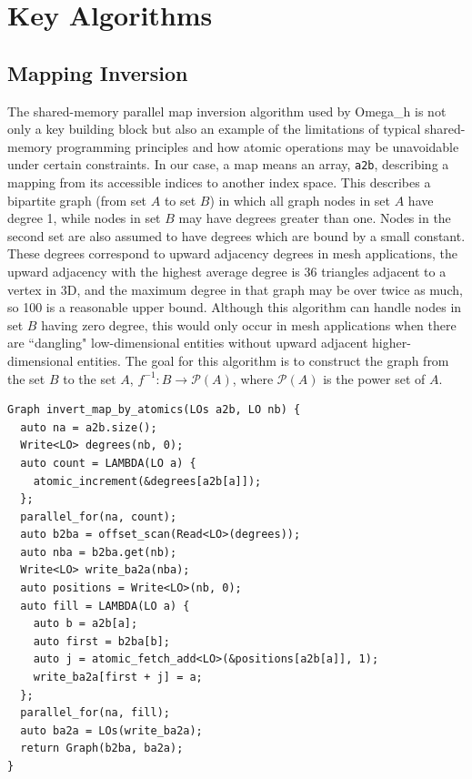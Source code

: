 
\appendix    %

\chapter{Key Algorithms}

\section{Mapping Inversion}
\label{sec:invert_map}

The shared-memory parallel map inversion algorithm used by
Omega\_h is not only a key building block but also an example
of the limitations of typical shared-memory programming principles
and how atomic operations may be unavoidable under certain constraints.
In our case, a map means an array, \texttt{a2b}, describing a mapping from
its accessible indices to another index space.
This describes a bipartite graph (from set $A$ to set $B$) in which all graph nodes
in set $A$ have degree 1, while nodes in set $B$ may
have degrees greater than one.
Nodes in the second set are also assumed to have degrees
which are bound by a small constant.
These degrees correspond to upward adjacency degrees in mesh
applications, the upward adjacency with the highest average degree is 36
triangles adjacent to a vertex in 3D, and the maximum degree in that
graph may be over twice as much, so 100 is a reasonable upper bound.
Although this algorithm can handle nodes in set $B$ having zero degree,
this would only occur in mesh applications when there are ``dangling"
low-dimensional entities without upward adjacent higher-dimensional entities.
The goal for this algorithm is to construct the graph from the set $B$ to the set $A$,
$f^{-1}:B\to \mathcal{P}(A)$, where $\mathcal{P}(A)$ is the power set of $A$.

\begin{lstlisting}[float,style=dan-style,caption=Invert map by atomics,label=lst:invert_map]
Graph invert_map_by_atomics(LOs a2b, LO nb) {
  auto na = a2b.size();
  Write<LO> degrees(nb, 0);
  auto count = LAMBDA(LO a) {
    atomic_increment(&degrees[a2b[a]]);
  };
  parallel_for(na, count);
  auto b2ba = offset_scan(Read<LO>(degrees));
  auto nba = b2ba.get(nb);
  Write<LO> write_ba2a(nba);
  auto positions = Write<LO>(nb, 0);
  auto fill = LAMBDA(LO a) {
    auto b = a2b[a];
    auto first = b2ba[b];
    auto j = atomic_fetch_add<LO>(&positions[a2b[a]], 1);
    write_ba2a[first + j] = a;
  };
  parallel_for(na, fill);
  auto ba2a = LOs(write_ba2a);
  return Graph(b2ba, ba2a);
}
\end{lstlisting}

